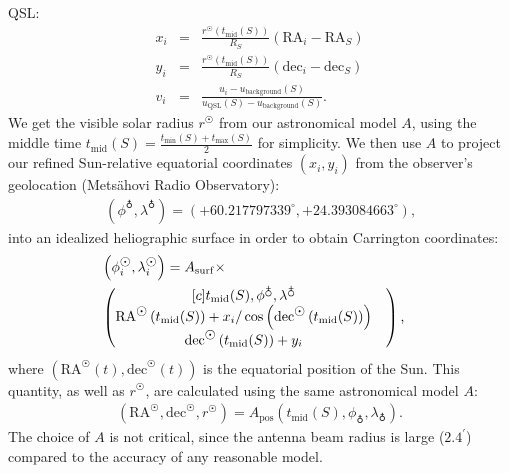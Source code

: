 \documentclass{aa}
\newcommand{\arrc}[1]{\begin{matrix}[c] #1 \end{matrix}}
\newcommand{\eqnl}[2]{\begin{eqnarray}\label{#1}#2\end{eqnarray}}
\newcommand{\s}[2]{{#1}_{\mathrm{#2}}}
\begin{document}
QSL:
\eqnl{calibration}{
x_i &=& \frac{r^{\astrosun} \left( \s{t}{mid}(S) \right)}{R_S} \left( \mathrm{RA}_i -  \mathrm{RA}_S  \right) \\
y_i &=& \frac{r^{\astrosun} \left( \s{t}{mid}(S) \right)}{R_S} \left( \mathrm{dec}_i - \mathrm{dec}_S \right) \\
v_i &=& \frac{u_i - \s{u}{background}(S)}{\s{u}{QSL}(S) - \s{u}{background}(S)} \text{.}
}
We get the visible solar radius $r^{\astrosun}$ from our astronomical model $A$, using the middle time $\s{t}{mid}(S) = 
\frac{\s{t}{min}(S) + \s{t}{max}(S)}{2}$ for simplicity. We then use $A$ to project our refined Sun-relative equatorial coordinates $(x_i,y_i)$ 
from the observer's geolocation (Metsähovi Radio Observatory):
\eqnl{mro_geolocation}{
(\phi^{\earth}, \lambda^{\earth}) = \left( +60.217797339^{\circ}, +24.393084663^{\circ} 
\right) \text{,}}
into an idealized heliographic surface 
in order to obtain Carrington coordinates:
\eqnl{carrington_coordinates}{
&\left( \phi^{\astrosun}_i, 
\lambda^{\astrosun}_i \right) = A_{\rm surf} \times& \\
&\left( \arrc{\s{t}{mid}(S), \phi^{\earth}, \lambda^{\earth}
\\
\mathrm{RA}^{\astrosun} \left( \s{t}{mid}(S) \right) + x_i / \cos \left( \mathrm{dec}^{\astrosun} \left( \s{t}{mid}(S) \right) \right)&
\\
\mathrm{dec}^{\astrosun} \left( \s{t}{mid}(S) \right) + y_i} \right) \nonumber 
\text{,}
}
where $\left( \mathrm{RA}^{\astrosun}(t), \mathrm{dec}^{\astrosun}(t) \right)$ is the equatorial position of the Sun. This quantity, as well as $r^{\astrosun}$, are calculated using the same astronomical model $A$:
\eqnl{astromodel}{
\left( \mathrm{RA}^{\astrosun}, \mathrm{dec}^{\astrosun}, r^{\astrosun} \right) = \s{A}{pos} \left( \s{t}{mid}(S), \phi_{\earth}, \lambda_{\earth} \right) \text{.}
}
The choice of $A$ is not critical, since the antenna beam radius is large ($2.4^\prime$) compared to the accuracy of any 
reasonable model.
\end{document}
